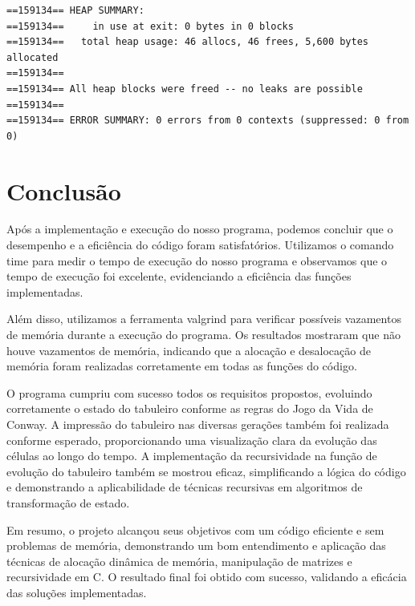 \documentclass{article}
\begin{document}
\begin{lstlisting}[caption={},label={lst:cod1},language={[x86masm]Assembler}]
==159134== HEAP SUMMARY:
==159134==     in use at exit: 0 bytes in 0 blocks
==159134==   total heap usage: 46 allocs, 46 frees, 5,600 bytes allocated
==159134== 
==159134== All heap blocks were freed -- no leaks are possible
==159134== 
==159134== ERROR SUMMARY: 0 errors from 0 contexts (suppressed: 0 from 0)

 \end{lstlisting}





\section{Conclusão}
\par Após a implementação e execução do nosso programa, podemos concluir que o desempenho e a eficiência do código foram satisfatórios. Utilizamos o comando time para medir o tempo de execução do nosso programa e observamos que o tempo de execução foi excelente, evidenciando a eficiência das funções implementadas.

\par Além disso, utilizamos a ferramenta valgrind para verificar possíveis vazamentos de memória durante a execução do programa. Os resultados mostraram que não houve vazamentos de memória, indicando que a alocação e desalocação de memória foram realizadas corretamente em todas as funções do código.

\par O programa cumpriu com sucesso todos os requisitos propostos, evoluindo corretamente o estado do tabuleiro conforme as regras do Jogo da Vida de Conway. A impressão do tabuleiro nas diversas gerações também foi realizada conforme esperado, proporcionando uma visualização clara da evolução das células ao longo do tempo. A implementação da recursividade na função de evolução do tabuleiro também se mostrou eficaz, simplificando a lógica do código e demonstrando a aplicabilidade de técnicas recursivas em algoritmos de transformação de estado.

\par Em resumo, o projeto alcançou seus objetivos com um código eficiente e sem problemas de memória, demonstrando um bom entendimento e aplicação das técnicas de alocação dinâmica de memória, manipulação de matrizes e recursividade em C. O resultado final foi obtido com sucesso, validando a eficácia das soluções implementadas.
\end{document}

